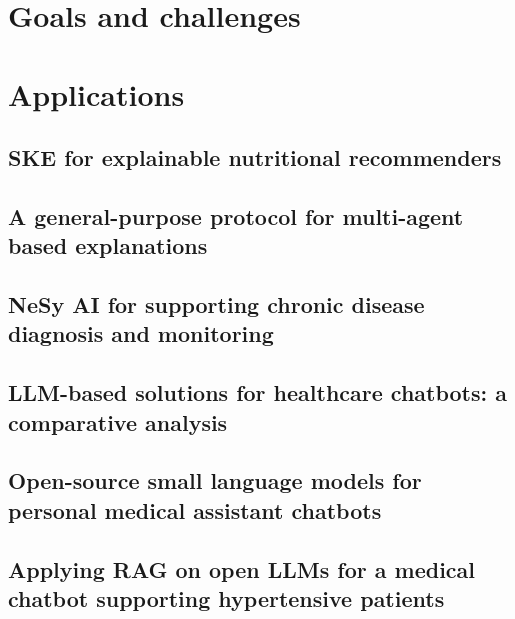 \documentclass[12pt,a4paper,openright,twoside]{book}
\begin{document}
\section{Goals and challenges}\label{sec:nesy-ai-goals-and-challenges}

\section{Applications}\label{sec:nesy-ai-applications}

\subsection{\Ac{SKE} for explainable nutritional recommenders}\label{subsec:ske-for-explainable-nutritional-recommenders}

\subsection{A general-purpose protocol for multi-agent based explanations}\label{subsec:a-general-purpose-protocol-for-multi-agent-based-explanations}

\subsection{\Acl{NeSy} \ac{AI} for supporting chronic disease diagnosis and monitoring}\label{subsec:nesy-ai-for-supporting-chronic-disease-diagnosis-and-monitoring}

\subsection{\Ac{LLM}-based solutions for healthcare chatbots: a comparative analysis}\label{subsec:llm-based-solutions-for-healthcare-chatbots-a-comparative-analysis}

\subsection{Open-source small language models for personal medical assistant chatbots}\label{subsec:open-source-small-language-models-for-personal-medical-assistant-chatbots}

\subsection{Applying \acl{RAG} on open \acp{LLM} for a medical chatbot supporting hypertensive patients}\label{subsec:applying-rag-on-open-llm-for-a-medical-chatbot-supporting-hypertensive-patients}
\end{document}
